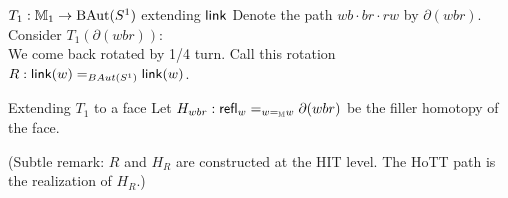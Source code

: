 \begin{frame}{\( T_1:\mathbb{M}_1\to\operatorname{BAut}(S^1) \) extending \( \operatorname{\mathsf{link}} \)}
Denote the path \( wb\cdot br\cdot rw \) by \alert{\( \partial(wbr) \)}.
Consider \( T_1(\partial(wbr)) \):
\[\]
We come back rotated by 1/4 turn. Call this rotation \( R:\operatorname{\mathsf{link}}(w)=_{BAut(S^1)}\operatorname{\mathsf{link}}(w) \).
\end{frame}

\begin{frame}{Extending \( T_1 \) to a face}
Let \( H_{wbr}:\mathsf{refl}_{w}=_{w=_{\mathbb{M}}w}\partial(wbr) \) be the filler homotopy of the face.




\[\]
(Subtle remark: \( R \) and \( H_R \) are constructed at the HIT level. The HoTT path is the \alert{realization} of \( H_R \).)
\end{frame}

% 
% 

